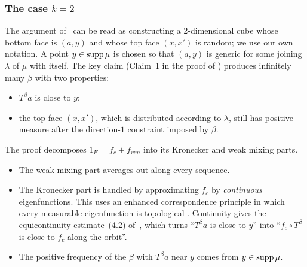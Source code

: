 \subsubsection*{The case $k=2$}
The argument of~\cite{kra2026short} can be read as constructing a $2$-dimensional cube
whose bottom face is $(a,y)$ and whose top face $(x,x')$ is random; we use our own
notation. A point $y\in\operatorname{supp}\mu$ is chosen so that $(a,y)$
is generic for some joining $\lambda$ of $\mu$ with itself.
The key claim (Claim~1 in the proof of \cite[Theorem~3.1]{kra2026short}) produces
infinitely many $\beta$ with two properties:
\begin{itemize}
\item $T^\beta a$ is close to $y$;
\item the top face $(x,x')$, which is distributed according to $\lambda$, still has positive
measure after the direction-$1$ constraint imposed by $\beta$.
\end{itemize}
The proof decomposes $1_E=f_c+f_{wm}$ into its Kronecker and weak mixing parts.
\begin{itemize}
\item The weak mixing part averages out along every \Fol{} sequence.
\item The Kronecker part is handled by approximating $f_c$ by \emph{continuous}
eigenfunctions. This uses an enhanced correspondence principle in which every measurable
eigenfunction is topological \cite[Theorem~2.5(4)]{kra2026short}. Continuity gives the
equicontinuity estimate~(4.2) of~\cite{kra2026short}, which turns ``$T^\beta a$ is close to
$y$'' into ``$f_c\circ T^\beta$ is close to $f_c$ along the orbit''.
\item The positive frequency of the $\beta$ with $T^\beta a$ near $y$ comes from
$y\in\operatorname{supp}\mu$.
\end{itemize}

